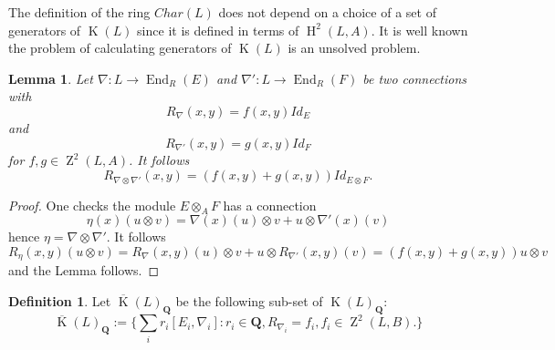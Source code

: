 \documentclass{amsart}
\theoremstyle{plain}
\newtheorem{lemma}[theorem]{Lemma}
\theoremstyle{definition}
\newtheorem{definition}[theorem]{Definition}
\theoremstyle{remark}
\numberwithin{equation}{theorem}
\begin{document}
The definition of the ring $Char(L)$ does not depend on a choice of a set of generators of ${\operatorname{K}}(L)$ since it is defined
in terms of ${\operatorname{H} }^2(L,{A})$. It is well known the problem of calculating generators of ${\operatorname{K}}(L)$ is an unsolved problem.

\begin{lemma} Let $\nabla:L\rightarrow {\operatorname{End} }_{R}(E)$ and $\nabla':L\rightarrow {\operatorname{End} }_{R}(F)$ be two connections with
\[ R_{\nabla}(x,y)=f(x,y)Id_E\]
and
\[ R_{\nabla'}(x,y)=g(x,y)Id_F \]
for $f,g\in {\operatorname{Z}}^2(L,{A})$. It follows
\[R_{\nabla \otimes \nabla'}(x,y)=(f(x,y)+g(x,y))Id_{E\otimes F}.\]
\end{lemma}
\begin{proof} One checks the module $E\otimes_{A} F$ has a connection
\[ \eta(x)(u\otimes v)=\nabla(x)(u)\otimes v + u\otimes \nabla'(x)(v)\]
hence $\eta=\nabla \otimes \nabla'$.
It follows
\[ R_{\eta}(x,y)(u\otimes v)=R_{\nabla}(x,y)(u)\otimes v+u\otimes R_{\nabla'}(x,y)(v)=(f(x,y)+g(x,y))u\otimes v\]
and the Lemma follows.
\end{proof}

\begin{definition} Let $\overline{\operatorname{K}}(L)_{\mathbf{Q} }$ be the following sub-set of ${\operatorname{K}}(L)_{\mathbf{Q} }$:
\[ \overline{\operatorname{K}}(L)_{\mathbf{Q} }:=\{ \sum_i r_i[E_i,\nabla_i]:r_i \in {\mathbf{Q} },R_{\nabla_i}=f_i, f_i\in {\operatorname{Z}}^2(L,B).\} \]
\end{definition}
\end{document}
